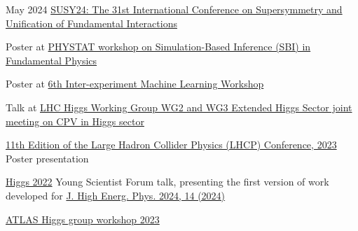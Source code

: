 
\begin{cventries}
    {}
    {May 2024}
    {\href{https://indico.cern.ch/event/1354279/contributions/5942297/}{SUSY24: The 31st International Conference on Supersymmetry and Unification of Fundamental Interactions}}
    {}\vspace*{2mm}

    {}
    {}
    {}
    {
        \begin{cvitems}
        \item Poster at \href{https://indico.cern.ch/event/1355601/contributions/5910202/}{PHYSTAT workshop on Simulation-Based Inference (SBI) in Fundamental Physics}
        \item Poster at \href{https://indico.cern.ch/event/1297159/contributions/5729232/}{6th Inter-experiment Machine Learning Workshop}
        \item Talk at \href{https://indico.cern.ch/event/1230456/\#5-simulation-based-inference-i}{LHC Higgs Working Group WG2 and WG3 Extended Higgs Sector joint meeting on CPV in Higgs sector}
        \end{cvitems}
    }\vspace*{2mm}
    
    {}
    {}
    {\href{https://indico.cern.ch/event/1198609/contributions/5340462/}{11th Edition of the Large Hadron Collider Physics (LHCP) Conference, 2023 }}
    {Poster presentation}\vspace*{2mm}
    
    {}
    {}
    {\href{https://indico.cern.ch/event/1086716/contributions/5049260/}{Higgs 2022}}
    {Young Scientist Forum talk, presenting the first version of work developed for \href{https://doi.org/10.1007/JHEP04(2024)014}{J. High Energ. Phys. 2024, 14 (2024)}}\vspace*{2mm}


    {}
    {}
    {\href{https://indico.cern.ch/event/1280531/contributions/5556190/}{ATLAS Higgs group workshop 2023}}{}\vspace*{2mm}


\end{cventries}
